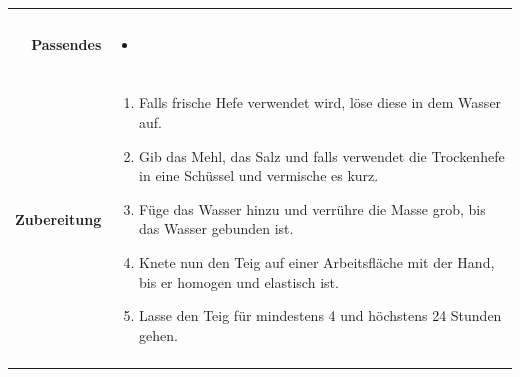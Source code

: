 \documentclass[a4paper, 12pt]{scrbook} 								%
\numberwithin{equation}{section} 									%
\begin{document}
\begin{tabularx}{\textwidth}[t]{r|L}
\begin{itemize}[nosep]
										\end{itemize}	\\
									&	\\	
			\textbf{Passendes}		&	\begin{itemize}[nosep]
											\item
										\end{itemize}	\\
									&	\\
			\textbf{Zubereitung}	&	\begin{enumerate}[nosep]
											\item	Falls frische Hefe verwendet wird, löse diese in dem Wasser auf.
											\item 	Gib das Mehl, das Salz und falls verwendet die Trockenhefe in eine Schüssel und vermische es kurz.
											\item 	Füge das Wasser hinzu und verrühre die Masse grob, bis das Wasser gebunden ist.
											\item 	Knete nun den Teig auf einer Arbeitsfläche mit der Hand, bis er homogen und elastisch ist.
											\item 	Lasse den Teig für mindestens 4 und höchstens 24 Stunden gehen.
										\end{enumerate}	\\
									&	\\
		\end{tabularx}

\end{document}
